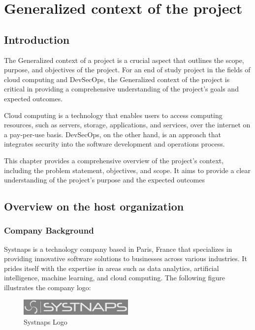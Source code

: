 \graphicspath{{./assets/}}
\setcounter{mtc}{1}
\chapter{Generalized context of the project }
\minitoc
\newpage
\section*{Introduction}
The Generalized context of a project is a crucial aspect that outlines the scope, purpose, and objectives of the project. For an end of study project in the fields of cloud computing and DevSecOps, the Generalized context of the project is critical in providing a comprehensive understanding of the project's goals and expected outcomes. 

Cloud computing is a technology that enables users to access computing resources, such as servers, storage, applications, and services, over the internet on a pay-per-use basis. DevSecOps, on the other hand, is an approach that integrates security into the software development and operations process. 

This chapter provides a comprehensive overview of the project's context, including the problem statement, objectives, and scope. It aims to provide a clear understanding of the project's purpose and the expected outcomes

\section{Overview on the host organization  }

\subsection{Company Background }
Systnaps is a technology company based in Paris, France that specializes in providing innovative software solutions to businesses across various industries. It prides itself with the expertise in areas such as data analytics, artificial intelligence, machine learning, and cloud computing. The following figure illustrates the company logo: 

\begin{figure}[!ht]\centering
\includegraphics[width=0.5\textwidth,angle=00]{assets/fa.png}
\caption{Systnaps Logo}
\end{figure}

